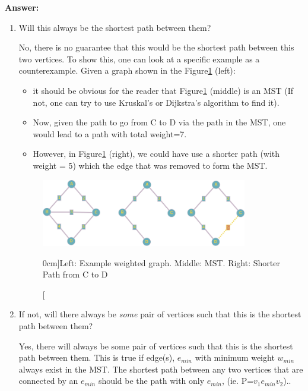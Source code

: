 \documentclass[nobib]{tufte-handout}
\newcounter{counter}
\begin{document}
\textbf{Answer:} \\ 
\begin{enumerate}
    \item Will this always be the shortest path between them?
    
    No, there is no guarantee that this would be the shortest path between this two vertices. To show this, one can look at a specific example as a counterexample. Given a graph shown in the Figure\ref{fig:ex4_full} (left):
    \begin{itemize}
        \item it should be obvious for the reader that Figure\ref{fig:ex4_full} (middle) is an MST (If not, one can try to use Kruskal's or Dijkstra's algorithm to find it).
        \item Now, given the path to go from C to D via the path in the MST, one would lead to a path with total weight=7.
        \item However, in Figure\ref{fig:ex4_full} (right), we could have use a shorter path (with weight = 5) which the edge that was removed to form the MST.  
    \end{itemize}  
    
\begin{figure}
  \centering
  \includegraphics[width=0.85\textwidth]{graphics/L6_prim_kruskal_dijkstra/ex4_full.png}
  \caption[][0cm]{Left: Example weighted graph. Middle: MST. Right: Shorter Path from C to D}
  \label{fig:ex4_full}
\end{figure}

    \item If not, will there always be \emph{some} pair of vertices such that this is the shortest path between them?
    
    Yes, there will always be some pair of vertices such that this is the shortest path between them. This is true if edge(s), $e_{min}$ with minimum weight $w_{min}$ always exist in the MST. The shortest path between any two vertices that are connected by an $e_{min}$ should be the path with only $e_{min}$, (ie. P=$v_1e_{min}v_2$)..
    

\end{enumerate}
\end{document}
